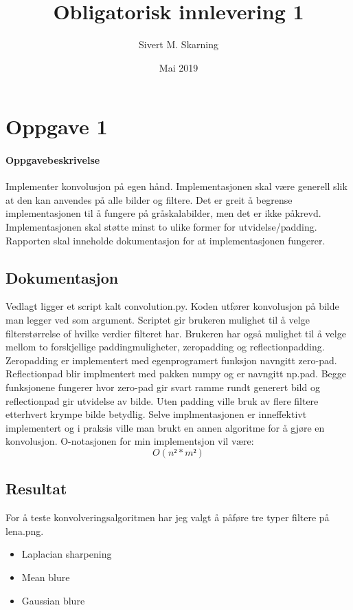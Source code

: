 \documentclass[a4paper, 12pt]{article}
\title{Obligatorisk innlevering 1}
\author{Sivert M. Skarning}
\date{Mai 2019}
\begin{document}
\maketitle
\section{Oppgave 1}
\paragraph{Oppgavebeskrivelse}
Implementer konvolusjon på egen hånd. Implementasjonen skal være generell slik at den kan anvendes på alle bilder og filtere. Det er greit å begrense implementasjonen til å fungere på gråskalabilder, men det er ikke påkrevd. Implementasjonen skal støtte minst to ulike former for utvidelse/padding. Rapporten skal inneholde dokumentasjon for at implementasjonen fungerer.
\subsection{Dokumentasjon}
Vedlagt ligger et script kalt convolution.py. Koden utfører konvolusjon på bilde man legger ved som argument. Scriptet gir brukeren mulighet til å velge filterstørrelse of hvilke verdier filteret har. Brukeren har også mulighet til å velge mellom to forskjellige paddingmuligheter, zeropadding og reflectionpadding. Zeropadding er implementert med egenprogramert funksjon navngitt zero-pad.
Reflectionpad blir implmentert med pakken numpy og er navngitt np.pad. Begge funksjonene fungerer hvor zero-pad gir svart ramme rundt generert bild og reflectionpad gir utvidelse av bilde. Uten padding ville bruk av flere filtere etterhvert krympe bilde betydlig.
Selve implmentasjonen er inneffektivt implementert og i praksis ville man brukt en annen algoritme for å gjøre en konvolusjon. O-notasjonen for min implementsjon vil være: $$O(n² * m²)$$



\subsection{Resultat}
For å teste konvolveringsalgoritmen har jeg valgt å påføre tre typer filtere på lena.png.
\begin{itemize}
   \item Laplacian sharpening
   \item Mean blure
   \item Gaussian blure
\end{itemize}
\end{document}
